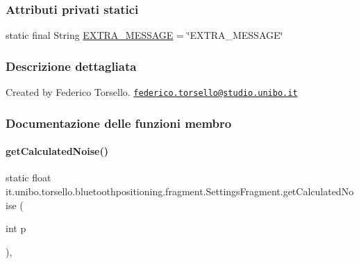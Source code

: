 \subsubsection*{Attributi privati statici}
\begin{DoxyCompactItemize}
\item 
static final String \hyperlink{classit_1_1unibo_1_1torsello_1_1bluetoothpositioning_1_1fragment_1_1SettingsFragment_a3f3c627008cd1e176afc52642c73fd93_a3f3c627008cd1e176afc52642c73fd93}{E\+X\+T\+R\+A\+\_\+\+M\+E\+S\+S\+A\+GE} = \char`\"{}E\+X\+T\+R\+A\+\_\+\+M\+E\+S\+S\+A\+GE\char`\"{}
\end{DoxyCompactItemize}


\subsubsection{Descrizione dettagliata}
Created by Federico Torsello. \href{mailto:federico.torsello@studio.unibo.it}{\tt federico.\+torsello@studio.\+unibo.\+it} 

\subsubsection{Documentazione delle funzioni membro}
\hypertarget{classit_1_1unibo_1_1torsello_1_1bluetoothpositioning_1_1fragment_1_1SettingsFragment_a595d859602f34ca81957a0578c1602a6_a595d859602f34ca81957a0578c1602a6}{}\label{classit_1_1unibo_1_1torsello_1_1bluetoothpositioning_1_1fragment_1_1SettingsFragment_a595d859602f34ca81957a0578c1602a6_a595d859602f34ca81957a0578c1602a6} 
\paragraph{\texorpdfstring{get\+Calculated\+Noise()}{getCalculatedNoise()}}
{\footnotesize\ttfamily static float it.\+unibo.\+torsello.\+bluetoothpositioning.\+fragment.\+Settings\+Fragment.\+get\+Calculated\+Noise (\begin{DoxyParamCaption}\item[{int}]{p }\end{DoxyParamCaption})\hspace{0.3cm}{\ttfamily [static]}, {\ttfamily [private]}}


